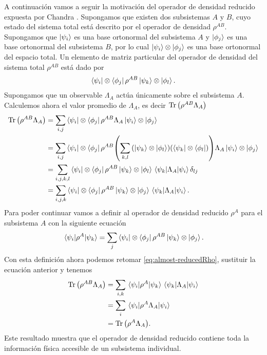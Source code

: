 A continuación vamos a seguir la motivación del operador 
de densidad reducido expuesta por Chandra \cite{chandra2013quantum}. 
Supongamos que existen dos subsistemas $A$ y $B$, cuyo estado del 
sistema total está 
descrito por el operador de densidad $\rho^{AB}$. Supongamos que 
$\ket{\psi_i}$ es una base ortonormal 
del subsistema $A$ y $\ket{\phi_j}$ es
una base ortonormal del subsistema $B$, 
por lo cual $\ket{\psi_i}\otimes \ket{\phi_j}$
es una base ortonormal del espacio total. Un elemento de matriz particular 
del operador de densidad del sistema total $\rho^{AB}$ está dado por
\begin{align}
	\bra{\psi_i}\otimes\bra{\phi_j}\rho^{AB}\ket{\psi_k}\otimes\ket{\phi_l}.
\end{align}
Supongamos que un observable $\Lambda_A$ actúa únicamente sobre el 
subsistema $A$. Calculemos ahora el valor promedio de $\Lambda_A$, es decir
$\Tr\qty(\rho^{AB}\Lambda_A)$
\begin{align}
	\Tr \qty(\rho^{AB}\Lambda_A) &= \sum _{i,j} 
	\bra{\psi_i}\ten\bra{\phi_j}\rho^{AB}\Lambda_A\ket{\psi_i}\ten\ket{\phi_j} \\
	&= \sum _{i,j} 
	\bra{\psi_i}\ten\bra{\phi_j}\rho^{AB}
	\qty(\sum _{k,l} \qty(\ket{\psi_k}\ten\ket{\phi_l})
	\qty(\bra{\psi_k}\ten\bra{\phi_l}))
	\Lambda_A\ket{\psi_i}\ten\ket{\phi_j}\\
	&= \sum _{i,j,k,l} 
	\bra{\psi_i}\ten\bra{\phi_j}\rho^{AB}\ket{\psi_k}\ten\ket{\phi_l}
	\matrixel{\psi_k}{\Lambda_A}{\psi_i}\delta _{lj} \\
	&= \sum _{i,j,k} 
	\bra{\psi_i}\ten\bra{\phi_j}\rho^{AB}\ket{\psi_k}\ten\ket{\phi_j}
	\matrixel{\psi_k}{\Lambda_A}{\psi_i}. \label{eq:almost-reducedRho}
\end{align}
Para poder continuar vamos a definir al operador de densidad
reducido $\rho^A$ para el subsistema $A$ con la siguiente ecuación
\cite{chandra2013quantum}
\begin{align}
	\matrixel{\psi_i}{\rho^A}{\psi_k} = 
	\sum _j \bra{\psi_i}\ten\bra{\phi_j}\rho^{AB}\ket{\psi_k}\ten\ket{\phi_j}.
	\label{eq:reducedRho-def1}
\end{align}
Con esta definición ahora podemos retomar  \eqref{eq:almost-reducedRho},
sustituir la ecuación anterior y tenemos
\begin{align}
	\Tr \qty(\rho^{AB}\Lambda_A)&= \sum _{i,k}
	\matrixel{\psi_i}{\rho^A}{\psi_k} \matrixel{\psi_k}{\Lambda_A}{\psi_i}\\
	&= \sum_i \matrixel{\psi_i}{\rho^A\Lambda_A}{\psi_i}\\
	&= \Tr \qty(\rho^A\Lambda_A). \label{eq:reduced-works}
\end{align}
Este resultado muestra que el operador de densidad reducido 
contiene toda la información física accesible de un subsistema individual.

